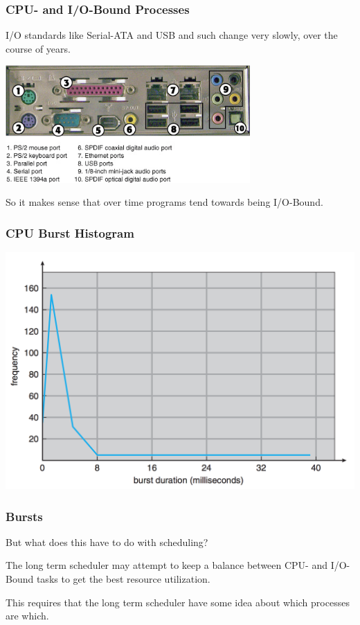 \begin{frame}
\frametitle{CPU- and I/O-Bound Processes}


I/O standards like Serial-ATA and USB and such change very slowly, over the course of years. 

\begin{center}
	\includegraphics[width=0.7\textwidth]{images/ports.jpg}
\end{center}

So it makes sense that over time programs tend towards being I/O-Bound. 

\end{frame}

\begin{frame}
\frametitle{CPU Burst Histogram}

\begin{center}
\includegraphics[width=\textwidth]{images/cpu-burst-histogram.png}
\end{center}

\end{frame}

\begin{frame}
\frametitle{Bursts}

But what does this have to do with scheduling? 

The long term scheduler may attempt to keep a balance between CPU- and I/O-Bound tasks to get the best resource utilization. 

This requires that the long term scheduler have some idea about which processes are which.

\end{frame}

